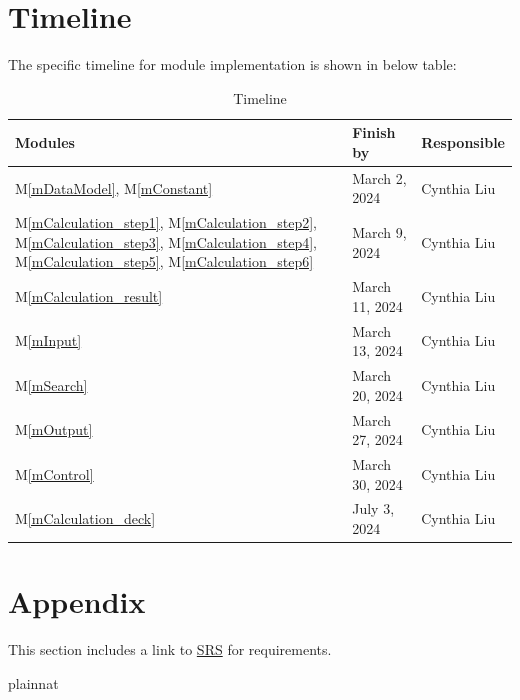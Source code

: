 \documentclass[12pt, titlepage]{article}
\newcommand{\mref}[1]{M\ref{#1}}
\begin{document}
\section{Timeline}
The specific timeline for module implementation is shown in below table:
\begin{table}[H]
\centering
\begin{tabular}{p{} p{}  p{}}
\toprule
 \textbf{Modules} & \textbf{Finish by} & \textbf{Responsible} \\
\midrule
\mref{mDataModel}, \mref{mConstant} & March 2, 2024& Cynthia Liu\\
\mref{mCalculation_step1}, \mref{mCalculation_step2}, \mref{mCalculation_step3}, \mref{mCalculation_step4}, \mref{mCalculation_step5}, \mref{mCalculation_step6} & March 9, 2024& Cynthia Liu\\
\mref{mCalculation_result} & March 11, 2024& Cynthia Liu\\
\mref{mInput} & March 13, 2024 & Cynthia Liu\\
\mref{mSearch} & March 20, 2024 & Cynthia Liu\\
\mref{mOutput}  & March 27, 2024 & Cynthia Liu\\
\mref{mControl} & March 30, 2024 & Cynthia Liu\\
\mref{mCalculation_deck} & July 3, 2024 & Cynthia Liu\\

\bottomrule
\end{tabular}
\caption{Timeline}
\end{table}


\section{Appendix}
This section includes a link to \href{https://github.com/CynthiaLiu0805/BridgeCorrosion/blob/main/docs/SRS/SRS.pdf}{SRS} for requirements.


 {plainnat}


\newpage{}
\end{document}
